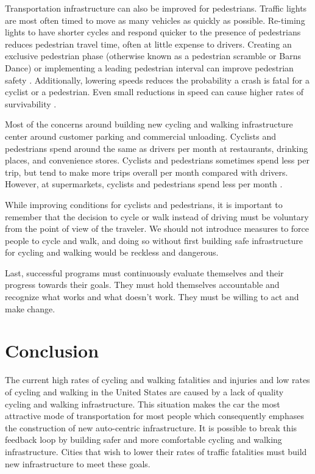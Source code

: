 \documentclass{article}
\begin{document}
Transportation infrastructure can also be improved for pedestrians. Traffic lights are most often timed to move as many vehicles as quickly as possible. Re-timing lights to have shorter cycles and respond quicker to the presence of pedestrians reduces pedestrian travel time, often at little expense to drivers. Creating an exclusive pedestrian phase (otherwise known as a pedestrian scramble or Barns Dance) or implementing a leading pedestrian interval can improve pedestrian safety \citep[Page 10-12]{kothuri2017}. Additionally, lowering speeds reduces the probability a crash is fatal for a cyclist or a pedestrian. Even small reductions in speed can cause higher rates of survivability \citep[Page 151]{kroyer2014}.

Most of the concerns around building new cycling and walking infrastructure center around customer parking and commercial unloading. Cyclists and pedestrians spend around the same as drivers per month at restaurants, drinking places, and convenience stores. Cyclists and pedestrians sometimes spend less per trip, but tend to make more trips overall per month compared with drivers. However, at supermarkets, cyclists and pedestrians spend less per month \citep[Page 24-26]{clifton2013}.

While improving conditions for cyclists and pedestrians, it is important to remember that the decision to cycle or walk instead of driving must be voluntary from the point of view of the traveler. We should not introduce measures to force people to cycle and walk, and doing so without first building safe infrastructure for cycling and walking would be reckless and dangerous.

Last, successful programs must continuously evaluate themselves and their progress towards their goals. They must hold themselves accountable and recognize what works and what doesn't work. They must be willing to act and make change.

\section*{Conclusion}
The current high rates of cycling and walking fatalities and injuries and low rates of cycling and walking in the United States are caused by a lack of quality cycling and walking infrastructure. This situation makes the car the most attractive mode of transportation for most people which consequently emphases the construction of new auto-centric infrastructure. It is possible to break this feedback loop by building safer and more comfortable cycling and walking infrastructure. Cities that wish to lower their rates of traffic fatalities must build new infrastructure to meet these goals.


\end{document}
